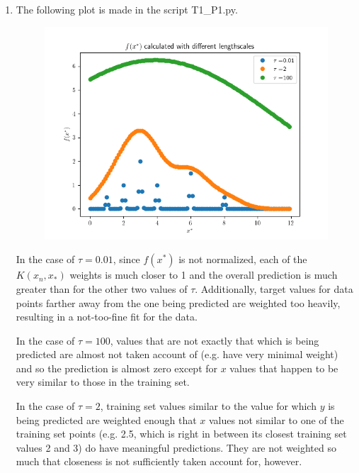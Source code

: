 \documentclass[submit]{harvardml}
\begin{document}
\begin{enumerate}
\newpage
\item 

The following plot is made in the script T1\_P1.py.

\begin{figure}[h]
\includegraphics[scale=0.8]{P1}
\centering
\end{figure}

In the case of $\tau=0.01$, since $f(x^*)$ is not normalized, each of the $K(x_n, x_*)$ weights
is much closer to 1 and the overall prediction is much greater than for the other two values of 
$\tau$. Additionally, target values for data points farther away from the one being 
predicted are weighted too heavily, resulting in a not-too-fine fit for the data.

In the case of $\tau=100$, values that are not exactly that which is being predicted are almost
not taken account of (e.g. have very minimal weight) and so the prediction is almost zero except 
for $x$ values that happen to be very similar to those in the training set.

In the case of $\tau=2$, training set values similar to the value for which $y$ is being predicted
are weighted enough that $x$ values not similar to one of the training set points (e.g.
2.5, which is right in between its closest training set values 2 and 3) do have meaningful
predictions. They are not weighted so much that closeness is not sufficiently taken account for,
however.



\end{enumerate}

\newpage
\end{document}
